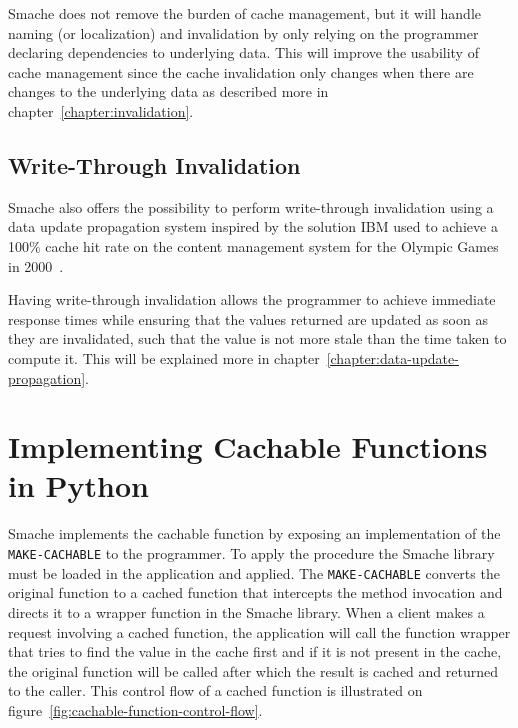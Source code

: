 Smache does not remove the burden of cache management, but it will handle naming (or localization) and invalidation by only relying on the programmer declaring dependencies to underlying data. This will improve the usability of cache management since the cache invalidation only changes when there are changes to the underlying data as described more in chapter~\ref{chapter:invalidation}.


\subsection{Write-Through Invalidation}
\label{subsec:write-through-updates}

Smache also offers the possibility to perform write-through invalidation using a data update propagation system inspired by the solution IBM used to achieve a 100\% cache hit rate on the content management system for the Olympic Games in 2000~\cite{paper:ibm, paper:ibm-extended}.

Having write-through invalidation allows the programmer to achieve immediate response times while ensuring that the values returned are updated as soon as they are invalidated, such that the value is not more stale than the time taken to compute it. This will be explained more in chapter~\ref{chapter:data-update-propagation}.


\section{Implementing Cachable Functions in Python}
\label{sec:implementing_cachable_functions_in_python}

Smache implements the cachable function by exposing an implementation of the \verb$MAKE-CACHABLE$ to the programmer. To apply the procedure the Smache library must be loaded in the application and applied. The \verb$MAKE-CACHABLE$ converts the original function to a cached function that intercepts the method invocation and directs it to a wrapper function in the Smache library. When a client makes a request involving a cached function, the application will call the function wrapper that tries to find the value in the cache first and if it is not present in the cache, the original function will be called after which the result is cached and returned to the caller. This control flow of a cached function is illustrated on figure~\ref{fig:cachable-function-control-flow}.


